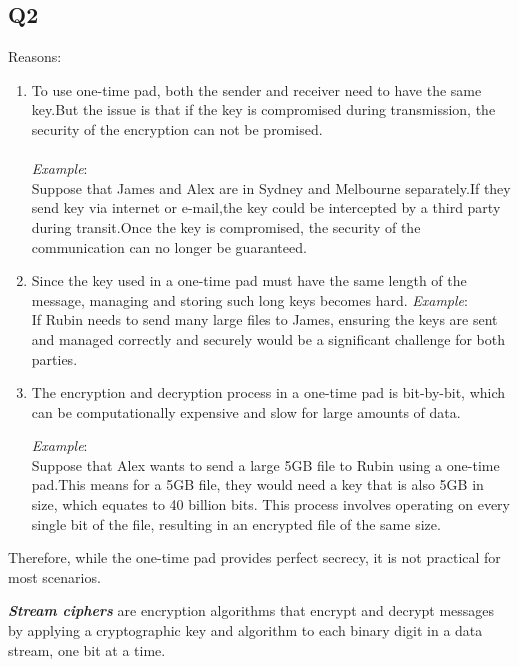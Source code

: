 \documentclass{article}
\begin{document}
\subsection{Q2}
	Reasons:
	\begin{enumerate}
		\item To use one-time pad, both the sender and receiver need to have the same key.But the issue is that if the key is compromised during transmission, the security of the encryption can not be promised.\\\\
		\textit{Example}:\\
		Suppose that James and Alex are in Sydney and Melbourne separately.If they send key via internet or e-mail,the key could be intercepted by a third party during transit.Once the key is compromised, the security of the communication can no longer be guaranteed.

		\item Since the key used in a one-time pad must have the same length of the message, managing and storing such long keys becomes hard.
		\textit{Example}:\\
		If Rubin needs to send many large files to James, ensuring the keys are sent and managed correctly and securely would be a significant challenge for both parties.

		\item The encryption and decryption process in a one-time pad is bit-by-bit, which can be computationally expensive and slow for large amounts of data.

		\textit{Example}:\\
		Suppose that Alex wants to send a large 5GB file to Rubin using a one-time pad.This means for a 5GB file, they would need a key that is also 5GB in size, which equates to 40 billion bits. This process involves operating on every single bit of the file, resulting in an encrypted file of the same size.

	\end{enumerate}
	Therefore, while the one-time pad provides perfect secrecy, it is not practical for most scenarios.\\

\newpage

	\textbf{\textit{Stream ciphers}} are encryption algorithms that encrypt and decrypt messages by applying a cryptographic key and algorithm to each binary digit in a data stream, one bit at a time\cite{OktaStreamCipher}.
\end{document}
